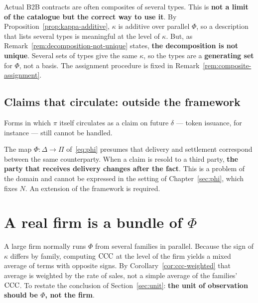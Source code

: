 Actual B2B contracts are often composites of several types. This is
\textbf{not a limit of the catalogue but the correct way to use it}.
By Proposition~\ref{prop:kappa-additive}, $\kappa$ is additive over parallel $\Phi$, so a
description that lists several types is meaningful at the level of $\kappa$.
But, as Remark~\ref{rem:decomposition-not-unique} states,
\textbf{the decomposition is not unique}. Several sets of types give the same $\kappa$, so
the types are a \textbf{generating set} for $\Phi$, not a basis.
The assignment procedure is fixed in Remark~\ref{rem:composite-assignment}.

\subsection{Claims that circulate: outside the framework}
\label{sec:token-limit}

Forms in which $\pi$ itself circulates as a claim on future $\delta$ --- token issuance, for
instance --- still cannot be handled.

The map $\Phi:\Delta\to\Pi$ of~\eqref{eq:phi} presumes that delivery and settlement
correspond between the same counterparty. When a claim is resold to a third party,
\textbf{the party that receives delivery changes after the fact}. This is a problem of the
domain and cannot be expressed in the setting of Chapter~\ref{sec:phi}, which fixes $N$.
An extension of the framework is required.

\section{A real firm is a bundle of \texorpdfstring{$\Phi$}{Phi}}

A large firm normally runs $\Phi$ from several families in parallel. Because the sign of
$\kappa$ differs by family, computing $\mathrm{CCC}$ at the level of the firm yields a mixed average
of terms with opposite signs. By Corollary~\ref{cor:ccc-weighted} that average is weighted
by the rate of sales, not a simple average of the families' $\mathrm{CCC}$.
To restate the conclusion of Section~\ref{sec:unit}:
\textbf{the unit of observation should be $\Phi$, not the firm}.

